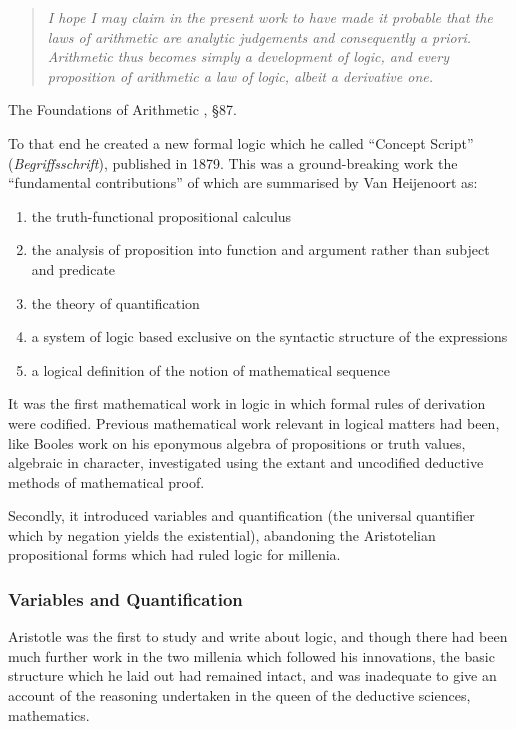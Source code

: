 \documentclass[10pt,titlepage]{book}
\begin{document}
\begin{quote}
{\it  I hope I may claim in the present work to have made it probable that the laws of arithmetic are analytic judgements and consequently \emph{a priori}.
Arithmetic thus becomes simply a development of logic, and every proposition of arithmetic a law of logic, albeit a derivative one.}
\end{quote}
The Foundations of Arithmetic \cite{frege1884}, §87.

To that end he created a new formal logic which he called ``Concept Script'' ({\it Begriffsschrift})\cite{heijenoort67,frege1879}, published in 1879.
This was a ground-breaking work the ``fundamental contributions'' of which are summarised by Van Heijenoort as:

\begin{enumerate}
\item the truth-functional propositional calculus
\item the analysis of proposition into function and argument rather than subject and predicate
\item the theory of quantification
\item a system of logic based exclusive on the syntactic structure of the expressions
  \item a logical definition of the notion of mathematical sequence
  \end{enumerate}


It was the first mathematical work in logic in which formal rules of derivation were codified.
Previous mathematical work relevant in logical matters had been, like Booles work on his eponymous algebra of propositions or truth values, algebraic in character, investigated using the extant and uncodified deductive methods of mathematical proof.

Secondly, it introduced variables and quantification (the universal quantifier which by negation yields the existential), abandoning the Aristotelian propositional forms which had ruled logic for millenia.

\subsubsection{Variables and Quantification}

Aristotle was the first to study and write about logic, and though there had been much further work in the two millenia which followed his innovations, the basic structure which he laid out had remained intact, and was inadequate to give an account of the reasoning undertaken in the queen of the deductive sciences, mathematics.
\end{document}
